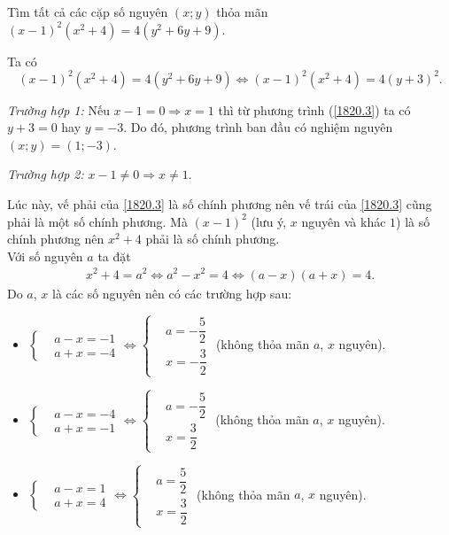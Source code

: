 \begin{ex}%
 Tìm tất cả các cặp số nguyên $(x;y)$ thỏa mãn $(x-1)^2(x^2+4)=4(y^2+6y+9)$.
 \loigiai
  {
  Ta có
  \begin{equation}\label{1820.3}
   (x-1)^2(x^2+4)=4(y^2+6y+9) \Leftrightarrow (x-1)^2(x^2+4)=4(y+3)^2.
  \end{equation}
  
\emph{Trường hợp 1:} Nếu $x-1=0\Rightarrow x=1$ thì từ phương trình (\ref{1820.3}) ta có $y+3=0$ hay $y=-3$. Do đó, phương trình ban đầu có nghiệm nguyên $(x;y)=(1;-3)$.

\emph{Trường hợp 2:} $x-1 \neq 0 \Rightarrow x \neq 1$.

Lúc này, vế phải của \eqref{1820.3} là số chính phương nên vế trái của \eqref{1820.3} cũng phải là một số chính phương. Mà $(x-1)^2$ (lưu ý, $x$ nguyên và khác $1$) là số chính phương nên $x^2+4$ phải là số chính phương.\\
  Với số nguyên $a$ ta đặt
  \begin{eqnarray*}
   x^2+4=a^2 \Leftrightarrow a^2-x^2=4 \Leftrightarrow (a-x)(a+x)=4.
  \end{eqnarray*}
  Do $a$, $x$ là các số nguyên nên có các trường hợp sau:
  \begin{itemize}
  	\item $\left\{\begin{aligned}&a-x=-1 \\&a+x=-4 \end{aligned} \right. \Leftrightarrow \left\{\begin{aligned}&a=-\dfrac{5}{2} \\&x=-\dfrac{3}{2} \end{aligned} \right.$ (không thỏa mãn $a$, $x$ nguyên).
  	\item $\left\{\begin{aligned}&a-x=-4 \\&a+x=-1 \end{aligned} \right. \Leftrightarrow \left\{\begin{aligned}&a=-\dfrac{5}{2} \\&x=\dfrac{3}{2} \end{aligned} \right.$ (không thỏa mãn $a$, $x$ nguyên).
  	\item $\left\{\begin{aligned}&a-x=1 \\&a+x=4 \end{aligned} \right. \Leftrightarrow \left\{\begin{aligned}&a=\dfrac{5}{2} \\&x=\dfrac{3}{2} \end{aligned} \right.$ (không thỏa mãn $a$, $x$ nguyên).

\end{itemize}}
\end{ex}
